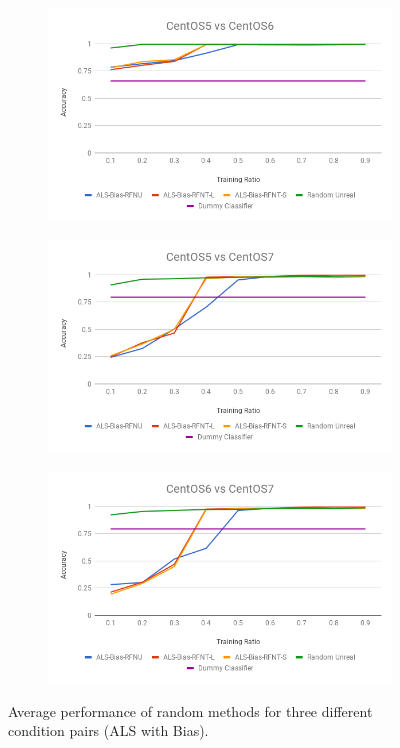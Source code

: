 \documentclass[10pt, conference, compsocconf]{IEEEtran}
\begin{document}
\begin{figure}[h!]
        \centering
        \begin{subfigure}[b]{0.8\linewidth}
                \includegraphics[width=\columnwidth]{figures/ALS-Bias/ALS-Bias-5vs6-PFS}
        \end{subfigure}
        \begin{subfigure}[b]{0.8\linewidth}
                \includegraphics[width=\columnwidth]{figures/ALS-Bias/ALS-Bias-5vs7-PFS}
        \end{subfigure}
        \begin{subfigure}[b]{0.8\linewidth}
                \includegraphics[width=\columnwidth]{figures/ALS-Bias/ALS-Bias-6vs7-PFS}
        \end{subfigure}
        \caption{Average performance of random methods for three different condition pairs (ALS with Bias).}
        \label{fig:ALS-Bias-PFS}
\end{figure}
\end{document}
